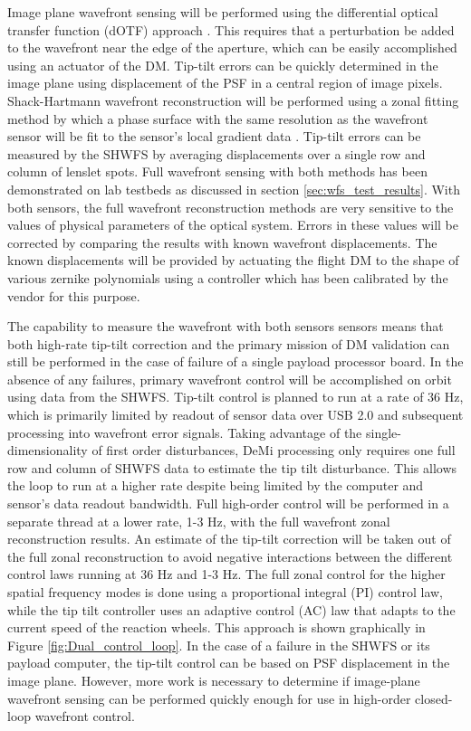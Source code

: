 \documentclass[]{spie}  %
\begin{document}
Image plane wavefront sensing will be performed using the differential optical transfer function (dOTF) approach \cite{codona_differential_2013}. This requires that a perturbation be added to the wavefront near the edge of the aperture, which can be easily accomplished using an actuator of the DM. Tip-tilt errors can be quickly determined in the image plane using displacement of the PSF in a central region of image pixels. Shack-Hartmann wavefront reconstruction will be performed using a zonal fitting method by which a phase surface with the same resolution as the wavefront sensor will be fit to the sensor's local gradient data \cite{southwell_wavefront_1980,herrmann_least-squares_1980}. Tip-tilt errors can be measured by the SHWFS by averaging displacements over a single row and column of lenslet spots. Full wavefront sensing with both methods has been demonstrated on lab testbeds as discussed in section \ref{sec:wfs_test_results}. With both sensors, the full wavefront reconstruction methods are very sensitive to the values of physical parameters of the optical system. Errors in these values will be corrected by comparing the results with known wavefront displacements. The  known displacements will be provided by actuating the flight DM to the shape of various zernike polynomials using a controller which has been calibrated by the vendor for this purpose.

The capability to measure the wavefront with both sensors sensors means that both high-rate tip-tilt correction and the primary mission of DM validation can still be performed in the case of failure of a single payload processor board. In the absence of any failures, primary wavefront control will be accomplished on orbit using data from the SHWFS. Tip-tilt control is planned to run at a rate of 36 Hz, which is primarily limited by readout of sensor data over USB 2.0 and subsequent processing into wavefront error signals. Taking advantage of the single-dimensionality of first order disturbances, DeMi processing only requires one full row and column of SHWFS data to estimate the tip tilt disturbance.  This allows the loop to run at a higher rate despite being limited by the computer and sensor's data readout bandwidth.  Full high-order control will be performed in a separate thread at a lower rate, 1-3 Hz, with the full wavefront zonal reconstruction results.  An estimate of the tip-tilt correction will be taken out of the full zonal reconstruction to avoid negative interactions between the different control laws running at 36 Hz and 1-3 Hz.  The full zonal control for the higher spatial frequency modes is done using a proportional integral (PI) control law, while the tip tilt controller uses an adaptive control (AC) law that adapts to the current speed of the reaction wheels.  This approach is shown graphically in Figure \ref{fig:Dual_control_loop}. In the case of a failure in the SHWFS or its payload computer, the tip-tilt control can be based on PSF displacement in the image plane. However, more work is necessary to determine if image-plane wavefront sensing can be performed quickly enough for use in high-order closed-loop wavefront control.
\end{document}
